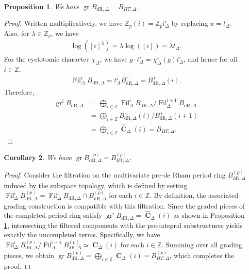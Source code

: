 \documentclass{amsart}
\newtheorem{proposition}{Proposition}[section]
\newtheorem{corollary}[proposition]{Corollary}
\DeclareMathOperator{\C}{\textbf{C}}
\DeclareMathOperator{\gr}{gr}
\newcommand{\mBdrp}{B^+_{\mathrm{dR},\Delta}}
\newcommand{\mBdr}{B_{\mathrm{dR},\Delta}}
\newcommand{\pmBdr}{B^{(p)}_{\mathrm{dR},\Delta}}
\newcommand{\mBHT}{B_{HT,\Delta}}
\newcommand{\pmBHT}{B^{(p)}_{HT,\Delta}}
\DeclareMathOperator{\Fil}{Fil}
\begin{document}
\begin{proposition}\label{de Rham Hodge Tate Proposition}
    We have $\gr\mBdr=\mBHT$.
\end{proposition}

\begin{proof}
    Written multiplicatively, we have $\mathbb{Z}_p(i)=\mathbb{Z}_p t^i_\Delta$ by replacing $u=t_\Delta$. Also, for $\lambda\in\mathbb{Z}_p$, we have
    \begin{align*}
        \log([\varepsilon]^\lambda)=\lambda\log([\varepsilon])=\lambda t_\Delta.
    \end{align*}
    For the cyclotomic character $\chi_\Delta$, we have $g\cdot t^i_\Delta=\chi^i_\Delta(g)t^i_\Delta$, and hence for all $i\in\mathbb{Z}$,
    \begin{align*}
        \Fil^i_\Delta\mBdr=t^i_\Delta\mBdrp=\mBdrp(i).
    \end{align*}
    Therefore,
    \begin{align*}
        \gr^i\mBdr&=\bigoplus\limits_{i\in\mathbb{Z}}\Fil^i_\Delta\mBdr/\Fil^{i+1}_\Delta\mBdr\\
                &=\bigoplus\limits_{i\in\mathbb{Z}}\mBdrp(i)/\mBdrp(i+1)\\
                &=\bigoplus\limits_{i\in\mathbb{Z}}\widehat{\C}_\Delta(i)=\mBHT.
    \end{align*}
\end{proof}

\begin{corollary}
    We have $\gr\pmBdr=\pmBHT$.
\end{corollary}

\begin{proof}
    Consider the filtration on the multivariate pre-de Rham period ring $\pmBdr$ induced by the subspace topology, which is defined by setting $\Fil^i_\Delta\pmBdr = \Fil^i_\Delta\mBdr \cap \pmBdr$ for each $i \in \mathbb{Z}$. By definition, the associated grading construction is compatible with this filtration. Since the graded pieces of the completed period ring satisfy $\gr^i\mBdr = \widehat{\C}_\Delta(i)$ as shown in Proposition \ref{de Rham Hodge Tate Proposition}, intersecting the filtered components with the pre-integral substructures yields exactly the uncompleted terms. Specifically, we have $\Fil^i_\Delta\pmBdr / \Fil^{i+1}_\Delta\pmBdr \simeq \C_\Delta(i)$ for each $i \in \mathbb{Z}$. Summing over all grading pieces, we obtain $\gr\pmBdr = \bigoplus_{i\in\mathbb{Z}}\C_\Delta(i) = \pmBHT$, which completes the proof.
\end{proof}
\end{document}
